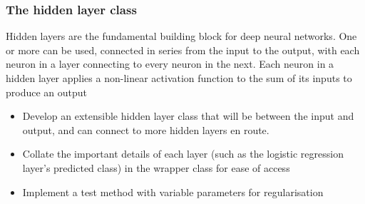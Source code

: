 \subsubsection{The hidden layer class}
Hidden layers are the fundamental building block for deep neural networks. One or more can be used, connected in series from the input to the output, with each neuron in a layer connecting to every neuron in the next. Each neuron in a hidden layer applies a non-linear activation function to the sum of its inputs to produce an output

\begin{itemize}

	\item Develop an extensible hidden layer class that will be between the input and output, and can connect to more hidden layers en route.
	\item Collate the important details of each layer (such as the logistic regression layer's predicted class) in the wrapper class for ease of access
	\item Implement a test method with variable parameters for regularisation
\end{itemize}


